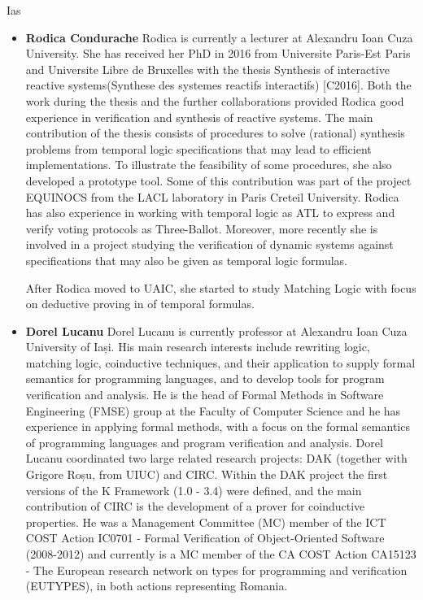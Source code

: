 \begin{sitedescription}{Ias}
\begin{itemize}
\item{\bf Rodica Condurache}
Rodica is currently a lecturer at Alexandru Ioan Cuza University. She has received her PhD in 2016 from Universite Paris-Est Paris and Universite Libre de Bruxelles with the thesis Synthesis of interactive reactive systems(Synthese des systemes reactifs interactifs) [C2016]. Both the work during the thesis and the further collaborations provided Rodica good experience in verification and synthesis of reactive systems. 
The main contribution of the thesis consists of procedures to solve (rational) synthesis problems from temporal logic specifications that may lead to efficient implementations. To illustrate the feasibility of some procedures, she also developed a prototype tool. Some of this contribution was part of the project EQUINOCS from the LACL laboratory in Paris Creteil University.
Rodica has also experience in working with temporal logic as ATL to express and verify voting protocols as Three-Ballot. Moreover, more recently she is involved in a project studying the verification of dynamic systems against specifications that may also be given as temporal logic formulas.

After Rodica moved to UAIC, she started to study Matching Logic with focus on deductive proving in of temporal formulas.

\item{\bf Dorel Lucanu}
Dorel Lucanu is currently professor at Alexandru Ioan Cuza University of Iași. His main research interests include rewriting logic, matching logic, coinductive techniques, and their application to supply formal semantics for programming languages, and to develop tools for program verification and analysis. He is the head of Formal Methods in Software Engineering (FMSE) group at the Faculty of Computer Science and he has experience in applying formal methods, with a focus on the formal semantics of programming languages and program verification and analysis. 
Dorel Lucanu coordinated two large related research projects: DAK (together with Grigore Roșu, from UIUC) and CIRC. Within the DAK project the first versions of the K Framework (1.0 - 3.4) were defined, and the main contribution of CIRC is the development of a prover for coinductive properties.
He was a Management Committee (MC) member of the ICT COST Action IC0701 - Formal Verification of Object-Oriented Software (2008-2012) and currently is a MC member of the CA COST Action CA15123 - The European research network on types for programming and verification (EUTYPES), in both actions representing Romania.


\end{itemize}
\end{sitedescription}
